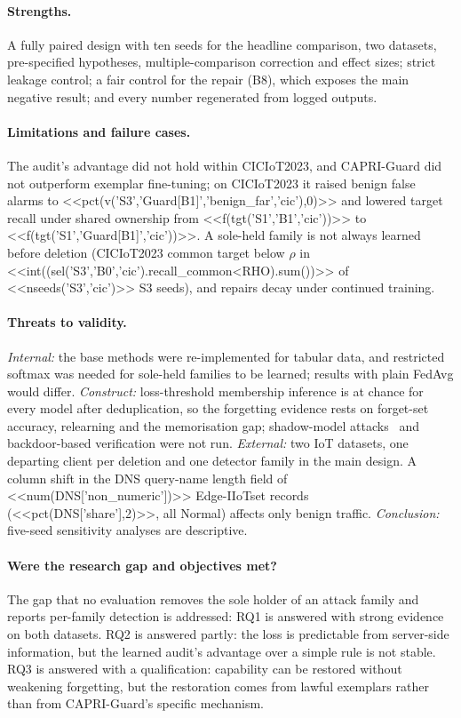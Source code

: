 \documentclass[pdflatex,sn-mathphys-num,iicol]{sn-jnl}
\begin{document}
\paragraph{Strengths.} A fully paired design with ten seeds for the headline comparison, two datasets, pre-specified hypotheses, multiple-comparison correction and effect sizes; strict leakage control; a fair control for the repair (B8), which exposes the main negative result; and every number regenerated from logged outputs.

\paragraph{Limitations and failure cases.} The audit's advantage did not hold within CICIoT2023, and CAPRI-Guard did not outperform exemplar fine-tuning; on CICIoT2023 it raised benign false alarms to <<pct(v('S3','Guard[B1]','benign_far','cic'),0)>> and lowered target recall under shared ownership from <<f(tgt('S1','B1','cic'))>> to <<f(tgt('S1','Guard[B1]','cic'))>>. A sole-held family is not always learned before deletion (CICIoT2023 common target below $\rho$ in <<int((sel('S3','B0','cic').recall_common<RHO).sum())>> of <<nseeds('S3','cic')>> S3 seeds), and repairs decay under continued training.

\paragraph{Threats to validity.} \emph{Internal:} the base methods were re-implemented for tabular data, and restricted softmax was needed for sole-held families to be learned; results with plain FedAvg would differ. \emph{Construct:} loss-threshold membership inference is at chance for every model after deduplication, so the forgetting evidence rests on forget-set accuracy, relearning and the memorisation gap; shadow-model attacks~\cite{shokri2017} and backdoor-based verification were not run. \emph{External:} two IoT datasets, one departing client per deletion and one detector family in the main design. A column shift in the DNS query-name length field of <<num(DNS['non_numeric'])>> Edge-IIoTset records (<<pct(DNS['share'],2)>>, all Normal) affects only benign traffic. \emph{Conclusion:} five-seed sensitivity analyses are descriptive.

\paragraph{Were the research gap and objectives met?} The gap that no evaluation removes the sole holder of an attack family and reports per-family detection is addressed: RQ1 is answered with strong evidence on both datasets. RQ2 is answered partly: the loss is predictable from server-side information, but the learned audit's advantage over a simple rule is not stable. RQ3 is answered with a qualification: capability can be restored without weakening forgetting, but the restoration comes from lawful exemplars rather than from CAPRI-Guard's specific mechanism.
\end{document}
